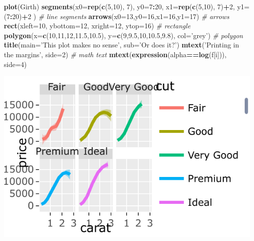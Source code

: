 \documentclass[]{book}
\newenvironment{Shaded}{\begin{snugshade}}{\end{snugshade}}
\newcommand{\CommentTok}[1]{\textcolor[rgb]{0.56,0.35,0.01}{\textit{#1}}}
\newcommand{\DataTypeTok}[1]{\textcolor[rgb]{0.13,0.29,0.53}{#1}}
\newcommand{\DecValTok}[1]{\textcolor[rgb]{0.00,0.00,0.81}{#1}}
\newcommand{\FloatTok}[1]{\textcolor[rgb]{0.00,0.00,0.81}{#1}}
\newcommand{\KeywordTok}[1]{\textcolor[rgb]{0.13,0.29,0.53}{\textbf{#1}}}
\newcommand{\NormalTok}[1]{#1}
\newcommand{\OperatorTok}[1]{\textcolor[rgb]{0.81,0.36,0.00}{\textbf{#1}}}
\newcommand{\StringTok}[1]{\textcolor[rgb]{0.31,0.60,0.02}{#1}}
\theoremstyle{definition}
\theoremstyle{definition}
\theoremstyle{definition}
\theoremstyle{remark}
\begin{document}
\begin{Shaded}
\begin{Highlighting}[]
\KeywordTok{plot}\NormalTok{(Girth)}
\KeywordTok{segments}\NormalTok{(}\DataTypeTok{x0=}\KeywordTok{rep}\NormalTok{(}\KeywordTok{c}\NormalTok{(}\DecValTok{5}\NormalTok{,}\DecValTok{10}\NormalTok{), }\DecValTok{7}\NormalTok{), }\DataTypeTok{y0=}\DecValTok{7}\OperatorTok{:}\DecValTok{20}\NormalTok{, }\DataTypeTok{x1=}\KeywordTok{rep}\NormalTok{(}\KeywordTok{c}\NormalTok{(}\DecValTok{5}\NormalTok{,}\DecValTok{10}\NormalTok{), }\DecValTok{7}\NormalTok{)}\OperatorTok{+}\DecValTok{2}\NormalTok{, }\DataTypeTok{y1=}\NormalTok{(}\DecValTok{7}\OperatorTok{:}\DecValTok{20}\NormalTok{)}\OperatorTok{+}\DecValTok{2}\NormalTok{ ) }\CommentTok{# line segments}
\KeywordTok{arrows}\NormalTok{(}\DataTypeTok{x0=}\DecValTok{13}\NormalTok{,}\DataTypeTok{y0=}\DecValTok{16}\NormalTok{,}\DataTypeTok{x1=}\DecValTok{16}\NormalTok{,}\DataTypeTok{y1=}\DecValTok{17}\NormalTok{) }\CommentTok{# arrows}
\KeywordTok{rect}\NormalTok{(}\DataTypeTok{xleft=}\DecValTok{10}\NormalTok{, }\DataTypeTok{ybottom=}\DecValTok{12}\NormalTok{,  }\DataTypeTok{xright=}\DecValTok{12}\NormalTok{, }\DataTypeTok{ytop=}\DecValTok{16}\NormalTok{) }\CommentTok{# rectangle}
\KeywordTok{polygon}\NormalTok{(}\DataTypeTok{x=}\KeywordTok{c}\NormalTok{(}\DecValTok{10}\NormalTok{,}\DecValTok{11}\NormalTok{,}\DecValTok{12}\NormalTok{,}\FloatTok{11.5}\NormalTok{,}\FloatTok{10.5}\NormalTok{), }\DataTypeTok{y=}\KeywordTok{c}\NormalTok{(}\DecValTok{9}\NormalTok{,}\FloatTok{9.5}\NormalTok{,}\DecValTok{10}\NormalTok{,}\FloatTok{10.5}\NormalTok{,}\FloatTok{9.8}\NormalTok{), }\DataTypeTok{col=}\StringTok{'grey'}\NormalTok{) }\CommentTok{# polygon}
\KeywordTok{title}\NormalTok{(}\DataTypeTok{main=}\StringTok{'This plot makes no sense'}\NormalTok{, }\DataTypeTok{sub=}\StringTok{'Or does it?'}\NormalTok{) }
\KeywordTok{mtext}\NormalTok{(}\StringTok{'Printing in the margins'}\NormalTok{, }\DataTypeTok{side=}\DecValTok{2}\NormalTok{) }\CommentTok{# math text}
\KeywordTok{mtext}\NormalTok{(}\KeywordTok{expression}\NormalTok{(alpha}\OperatorTok{==}\KeywordTok{log}\NormalTok{(f[i])), }\DataTypeTok{side=}\DecValTok{4}\NormalTok{)}
\end{Highlighting}
\end{Shaded}

\includegraphics[width=0.5\linewidth]{Rcourse_files/figure-latex/unnamed-chunk-252-1}
\end{document}
